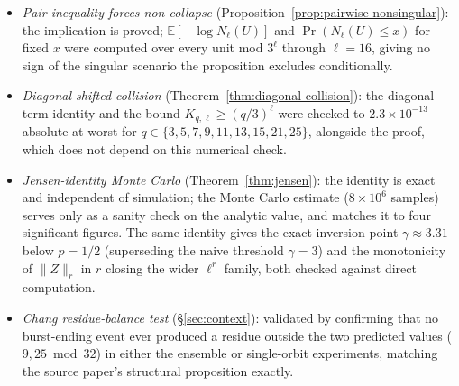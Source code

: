 \documentclass[11pt]{article}
\theoremstyle{definition}
\theoremstyle{remark}
\begin{document}
\begin{itemize}
  arithmetic through $\ell=10$, certifying
  $\beta_{\mathrm{eff}}\le1.882712$; the monotonicity of $\min_u
  R_\ell(u)$ itself has a full proof, cross-checked numerically at
  these levels. The saturation claim (the rate levels off rather than
  continuing to fall) is a separate, extended measurement in floating
  point through $\ell=16$: $\min_uR_\ell(u)$ climbs toward
  $\approx0.3803$ against an observed ratio $\min_uN_\ell(u)/\min_uN_{\ell-1}(u)$
  running at $0.93$--$0.97$.
\item \emph{Pair inequality forces non-collapse}
  (Proposition~\ref{prop:pairwise-nonsingular}): the implication is
  proved; $\mathbb{E}[-\log N_\ell(U)]$ and $\Pr(N_\ell(U)\le x)$ for
  fixed $x$ were computed over every unit mod $3^\ell$ through
  $\ell=16$, giving no sign of the singular scenario the proposition
  excludes conditionally.
\item \emph{Diagonal shifted collision}
  (Theorem~\ref{thm:diagonal-collision}): the diagonal-term identity
  and the bound $K_{q,\ell}\ge(q/3)^\ell$ were checked to
  $2.3\times10^{-13}$ absolute at worst for $q\in\{3,5,7,9,11,13,15,21,25\}$,
  alongside the proof, which does not depend on this numerical check.
\item \emph{Jensen-identity Monte Carlo} (Theorem~\ref{thm:jensen}):
  the identity is exact and independent of simulation; the Monte Carlo
  estimate ($8\times10^6$ samples) serves only as a sanity check on
  the analytic value, and matches it to four significant figures. The
  same identity gives the exact inversion point $\gamma\approx3.31$
  below $p=1/2$ (superseding the naive threshold $\gamma=3$) and the
  monotonicity of $\|Z\|_r$ in $r$ closing the wider $\ell^r$ family,
  both checked against direct computation.
\item \emph{Chang residue-balance test} (\S\ref{sec:context}):
  validated by confirming that no burst-ending event ever produced a
  residue outside the two predicted values ($9,25\bmod32$) in either
  the ensemble or single-orbit experiments, matching the source
  paper's structural proposition exactly.
\end{itemize}
\end{document}
